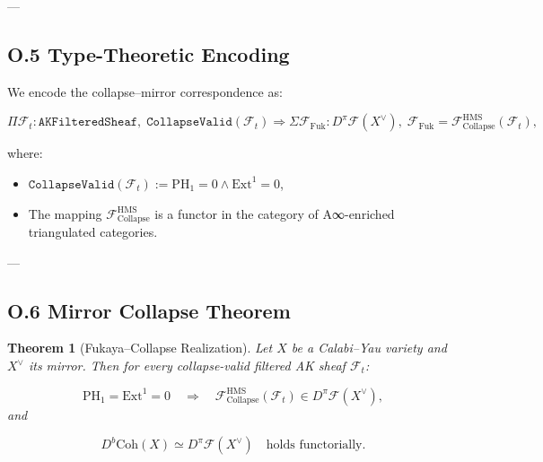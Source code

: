 \documentclass[11pt]{article}
\newtheorem{theorem}{Theorem}[section]
\begin{document}

---

\subsection*{O.5 Type-Theoretic Encoding}

We encode the collapse–mirror correspondence as:

\[
\Pi \mathcal{F}_t : \texttt{AKFilteredSheaf},\;
\texttt{CollapseValid}(\mathcal{F}_t)
\Rightarrow
\Sigma \mathcal{F}_{\mathrm{Fuk}} : D^\pi\mathcal{F}(X^\vee),\;
\mathcal{F}_{\mathrm{Fuk}} = \mathcal{F}_{\mathrm{Collapse}}^{\mathrm{HMS}}(\mathcal{F}_t),
\]

where:
\begin{itemize}
  \item $\texttt{CollapseValid}(\mathcal{F}_t) := \mathrm{PH}_1 = 0 \wedge \mathrm{Ext}^1 = 0$,
  \item The mapping $\mathcal{F}_{\mathrm{Collapse}}^{\mathrm{HMS}}$ is a functor in the category of A∞-enriched triangulated categories.
\end{itemize}

---

\subsection*{O.6 Mirror Collapse Theorem}

\begin{theorem}[Fukaya–Collapse Realization]
Let $X$ be a Calabi–Yau variety and $X^\vee$ its mirror. Then for every collapse-valid filtered AK sheaf $\mathcal{F}_t$:

\[
\mathrm{PH}_1 = \mathrm{Ext}^1 = 0
\quad \Rightarrow \quad
\mathcal{F}_{\mathrm{Collapse}}^{\mathrm{HMS}}(\mathcal{F}_t) \in D^\pi\mathcal{F}(X^\vee),
\]
and

\[
D^b\mathrm{Coh}(X) \simeq D^\pi\mathcal{F}(X^\vee)
\quad \text{holds functorially}.
\]
\end{theorem}
\end{document}
